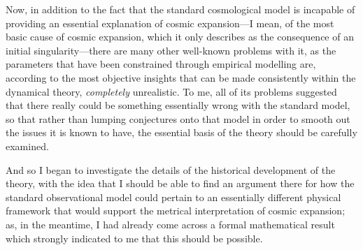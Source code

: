 Now, in addition to the fact that the standard cosmological model is incapable of providing an essential explanation of cosmic expansion---I mean, of the most basic cause of cosmic expansion, which it only describes as the consequence of an initial singularity---there are many other well-known problems with it, as the parameters that have been constrained through empirical modelling are, according to the most objective insights that can be made consistently within the dynamical theory, \textit{completely} unrealistic. To me, all of its problems suggested that there really could be something essentially wrong with the standard model, so that rather than lumping conjectures onto that model in order to smooth out the issues it is known to have, the essential basis of the theory should be carefully examined.

And so I began to investigate the details of the historical development of the theory, with the idea that I should be able to find an argument there for how the standard observational model could pertain to an essentially different physical framework that would support the metrical interpretation of cosmic expansion; as, in the meantime, I had already come across a formal mathematical result which strongly indicated to me that this should be possible.%

